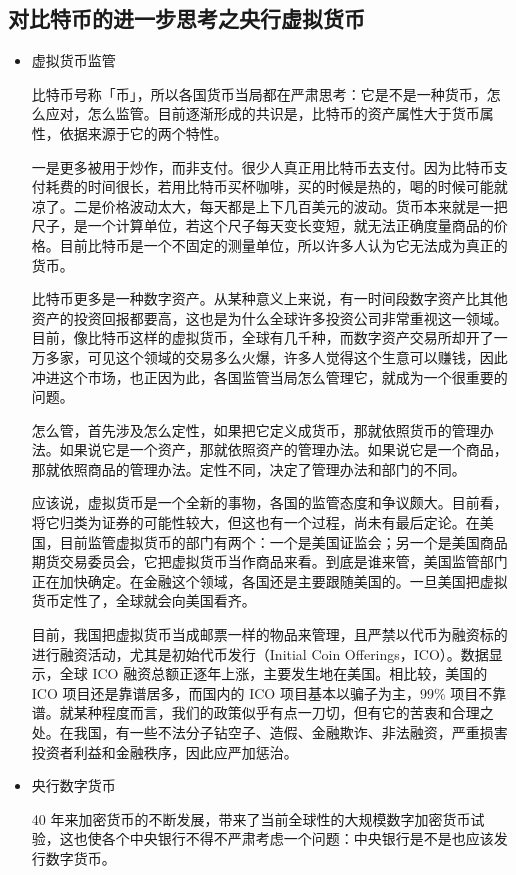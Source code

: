 \documentclass{article}
\begin{document}
\subsection{对比特币的进一步思考之央行虚拟货币}
\begin{itemize}
\item 虚拟货币监管\par
比特币号称「币」，所以各国货币当局都在严肃思考：它是不是一种货币，怎么应对，怎么监管。目前逐渐形成的共识是，比特币的资产属性大于货币属性，依据来源于它的两个特性。\par

一是更多被用于炒作，而非支付。很少人真正用比特币去支付。因为比特币支付耗费的时间很长，若用比特币买杯咖啡，买的时候是热的，喝的时候可能就凉了。二是价格波动太大，每天都是上下几百美元的波动。货币本来就是一把尺子，是一个计算单位，若这个尺子每天变长变短，就无法正确度量商品的价格。目前比特币是一个不固定的测量单位，所以许多人认为它无法成为真正的货币。\par

比特币更多是一种数字资产。从某种意义上来说，有一时间段数字资产比其他资产的投资回报都要高，这也是为什么全球许多投资公司非常重视这一领域。目前，像比特币这样的虚拟货币，全球有几千种，而数字资产交易所却开了一万多家，可见这个领域的交易多么火爆，许多人觉得这个生意可以赚钱，因此冲进这个市场，也正因为此，各国监管当局怎么管理它，就成为一个很重要的问题。\par

怎么管，首先涉及怎么定性，如果把它定义成货币，那就依照货币的管理办法。如果说它是一个资产，那就依照资产的管理办法。如果说它是一个商品，那就依照商品的管理办法。定性不同，决定了管理办法和部门的不同。\par

应该说，虚拟货币是一个全新的事物，各国的监管态度和争议颇大。目前看，将它归类为证券的可能性较大，但这也有一个过程，尚未有最后定论。在美国，目前监管虚拟货币的部门有两个：一个是美国证监会；另一个是美国商品期货交易委员会，它把虚拟货币当作商品来看。到底是谁来管，美国监管部门正在加快确定。在金融这个领域，各国还是主要跟随美国的。一旦美国把虚拟货币定性了，全球就会向美国看齐。\par

目前，我国把虚拟货币当成邮票一样的物品来管理，且严禁以代币为融资标的进行融资活动，尤其是初始代币发行（Initial Coin Offerings，ICO）。数据显示，全球 ICO 融资总额正逐年上涨，主要发生地在美国。相比较，美国的 ICO 项目还是靠谱居多，而国内的 ICO 项目基本以骗子为主，99\% 项目不靠谱。就某种程度而言，我们的政策似乎有点一刀切，但有它的苦衷和合理之处。在我国，有一些不法分子钻空子、造假、金融欺诈、非法融资，严重损害投资者利益和金融秩序，因此应严加惩治。\par
\item 央行数字货币\par
40 年来加密货币的不断发展，带来了当前全球性的大规模数字加密货币试验，这也使各个中央银行不得不严肃考虑一个问题：中央银行是不是也应该发行数字货币。\par


\end{itemize}
\end{document}
